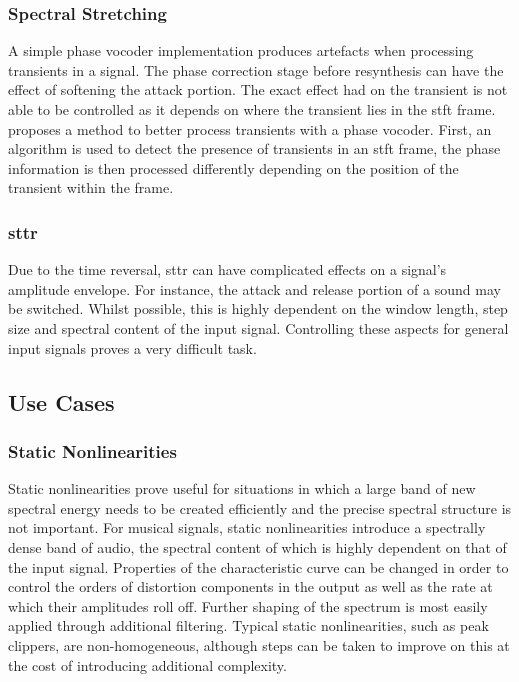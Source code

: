 		\subsubsection*{Spectral Stretching}
			A simple phase vocoder implementation produces artefacts when processing transients in a signal.
			The phase correction stage before resynthesis can have the effect of softening the attack portion.
			The exact effect had on the transient is not able to be controlled as it depends on where the
			transient lies in the \acrshort{stft} frame. \citet{robel2003a} proposes a method to better process
			transients with a phase vocoder. First, an algorithm is used to detect the presence of transients
			in an \acrshort{stft} frame, the phase information is then processed differently depending on the
			position of the transient within the frame.

		\subsubsection*{\acrshort{sttr}}
			Due to the time reversal, \acrshort{sttr} can have complicated effects on a signal's amplitude
			envelope.  For instance, the attack and release portion of a sound may be switched. Whilst
			possible, this is highly dependent on the window length, step size and spectral content of the
			input signal. Controlling these aspects for general input signals proves a very difficult task.

	\subsection{Use Cases}
	\label{sec:ExcitationEvaluation-Comparison-UseCases}
		\subsubsection*{Static Nonlinearities}
			Static nonlinearities prove useful for situations in which a large band of new spectral energy
			needs to be created efficiently and the precise spectral structure is not important. For musical
			signals, static nonlinearities introduce a spectrally dense band of audio, the spectral content of
			which is highly dependent on that of the input signal. Properties of the characteristic curve can
			be changed in order to control the orders of distortion components in the output as well as the
			rate at which their amplitudes roll off. Further shaping of the spectrum is most easily applied
			through additional filtering. Typical static nonlinearities, such as peak clippers, are
			non-homogeneous, although steps can be taken to improve on this at the cost of introducing
			additional complexity.
			
